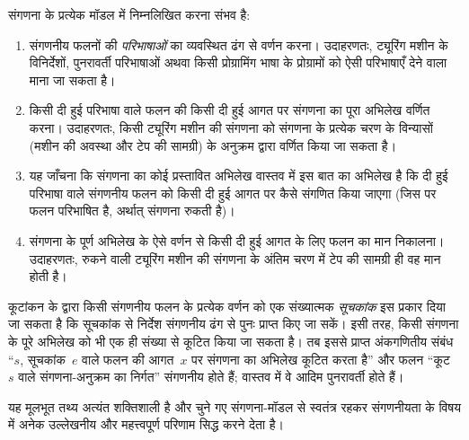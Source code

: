 \documentclass[../../../include/open-logic-section]{subfiles}
\begin{document}

संगणना के प्रत्येक मॉडल में निम्नलिखित करना संभव है:
\begin{enumerate}
\item संगणनीय फलनों की \emph{परिभाषाओं} का व्यवस्थित ढंग से वर्णन करना।
  उदाहरणतः, ट्यूरिंग मशीन के विनिर्देशों, पुनरावर्ती परिभाषाओं अथवा किसी
  प्रोग्रामिंग भाषा के प्रोग्रामों को ऐसी परिभाषाएँ देने वाला माना जा सकता है।
\item किसी दी हुई परिभाषा वाले फलन की किसी दी हुई आगत पर संगणना का पूरा
  अभिलेख वर्णित करना। उदाहरणतः, किसी ट्यूरिंग मशीन की संगणना को संगणना के
  प्रत्येक चरण के विन्यासों (मशीन की अवस्था और टेप की सामग्री) के अनुक्रम
  द्वारा वर्णित किया जा सकता है।
\item यह जाँचना कि संगणना का कोई प्रस्तावित अभिलेख वास्तव में इस बात का
  अभिलेख है कि दी हुई परिभाषा वाले संगणनीय फलन को किसी दी हुई आगत पर कैसे
  संगणित किया जाएगा (जिस पर फलन परिभाषित है, अर्थात् संगणना रुकती है)।
\item संगणना के पूर्ण अभिलेख के ऐसे वर्णन से किसी दी हुई आगत के लिए फलन का
  मान निकालना। उदाहरणतः, रुकने वाली ट्यूरिंग मशीन की संगणना के अंतिम चरण में
  टेप की सामग्री ही वह मान होती है।
\end{enumerate}

कूटांकन के द्वारा किसी संगणनीय फलन के प्रत्येक वर्णन को एक संख्यात्मक
\emph{सूचकांक} इस प्रकार दिया जा सकता है कि सूचकांक से निर्देश संगणनीय ढंग
से पुनः प्राप्त किए जा सकें। इसी तरह, किसी संगणना के पूरे अभिलेख को भी एक
ही संख्या से कूटित किया जा सकता है। तब इससे प्राप्त अंकगणितीय संबंध
``$s$, सूचकांक~$e$ वाले फलन की आगत~$x$ पर संगणना का अभिलेख कूटित करता
है'' और फलन ``कूट~$s$ वाले संगणना-अनुक्रम का निर्गत'' संगणनीय होते हैं;
वास्तव में वे आदिम पुनरावर्ती होते हैं।

यह मूलभूत तथ्य अत्यंत शक्तिशाली है और चुने गए संगणना-मॉडल से स्वतंत्र
रहकर संगणनीयता के विषय में अनेक उल्लेखनीय और महत्त्वपूर्ण परिणाम सिद्ध
करने देता है।
\end{document}
